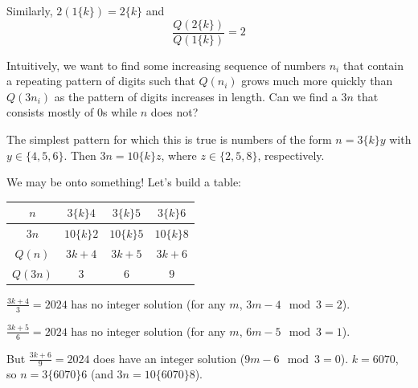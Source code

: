 \documentclass[11pt, oneside]{amsart}
\begin{document}
Similarly, $2(1\{k\}) = 2\{k\}$ and
\[ \frac{Q(2\{k\})}{Q(1\{k\})} = 2\]

Intuitively, we want to find some increasing sequence of numbers $n_i$ that contain a repeating pattern of digits
such that $Q(n_i)$ grows much more quickly than $Q(3n_i)$ as the pattern of digits increases in length.
Can we find a $3n$ that consists mostly of 0s while $n$ does not?

The simplest pattern for which this is true is numbers of the form $n = 3\{k\}y$ with $y \in \{ 4, 5, 6 \}$. Then
$3n = 10\{k\}z$, where $z \in \{ 2, 5, 8 \}$, respectively.

We may be onto something! Let's build a table:

\begin{table}[h!]
\centering
\begin{tabular}{|c|c|c|c|}
	\hline
	$n$      & $3\{k\}4$    & $3\{k\}5$    & $3\{k\}6$ \\
	\hline
	$3n$     & $10\{k\}2$   & $10\{k\}5$   & $10\{k\}8$ \\
	\hline
	$Q(n)$   & $3k+4$       & $3k+5$       & $3k+6$ \\
	\hline
	$Q(3n)$  & $3$          & $6$          & $9$ \\
	\hline
\end{tabular}
\end{table}

$\frac{3k+4}{3} = 2024$ has no integer solution (for any $m$, $3m-4 \mod 3 = 2$).

$\frac{3k+5}{6} = 2024$ has no integer solution (for any $m$, $6m-5 \mod 3 = 1$).

But $\frac{3k+6}{9} = 2024$ does have an integer solution ($9m-6 \mod 3 = 0$). $k = 6070$,
so $n = 3\{6070\}6$ (and $3n = 10\{6070\}8$).
\end{document}
